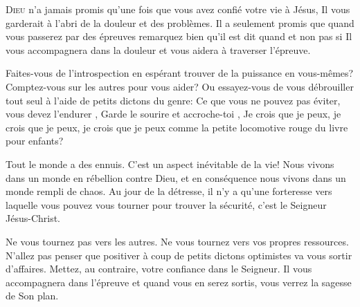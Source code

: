 



\lettrine{D}{ieu} n'a jamais promis qu'une fois que vous avez confié
 votre vie à Jésus, Il vous garderait à l'abri de la douleur et des problèmes.
 Il a seulement promis que quand vous passerez par des épreuves
 \ocadr remarquez bien qu'il est dit \Og quand \Fg{} et non pas \Og si \Fg{} \fcadr
 Il vous accompagnera dans la douleur et vous aidera à traverser l'épreuve. 


Faites-vous de l'introspection en espérant trouver de la puissance
 en vous-mêmes? Comptez-vous sur les autres pour vous aider?
 Ou essayez-vous de vous débrouiller tout seul à l'aide de petits dictons du genre:
 \Og Ce que vous ne pouvez pas éviter, vous devez l'endurer \Fg{},
 \Og Garde le sourire et accroche-toi \Fg{},
 \Og Je crois que je peux, je crois que je peux, je crois que je peux \Fg{}
 comme la petite locomotive rouge du livre pour enfants? 

Tout le monde a des ennuis. C'est un aspect inévitable de la vie!
 Nous vivons dans un monde en rébellion contre Dieu, et en conséquence
 nous vivons dans un monde rempli de chaos. Au jour de la détresse,
 il n'y a qu'une forteresse vers laquelle vous pouvez vous tourner
 pour trouver la sécurité, c'est le Seigneur Jésus-Christ. 

Ne vous tournez pas vers les autres. Ne vous tournez vers vos propres
 ressources. N'allez pas penser que \Og positiver \Fg{} à coup de petits dictons
 optimistes va vous sortir d'affaires.
 Mettez, au contraire, votre confiance dans le Seigneur.
 Il vous accompagnera dans l'épreuve et quand vous en serez sortis,
 vous verrez la sagesse de Son plan. 

\dvrule




